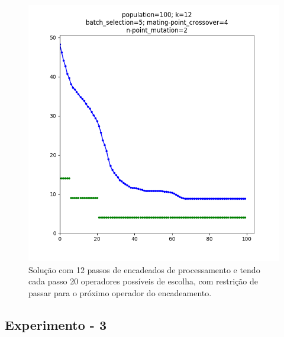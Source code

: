 \documentclass[fleqn,12pt]{SelfArx} %
\begin{document}
\begin{figure}[ht]\centering
\includegraphics[width=\linewidth]{./experiments/media_steps_12_op_20}
\caption{Solução com 12 passos de encadeados de processamento e tendo cada passo
20 operadores possíveis de escolha, com restrição de passar para o próximo
operador do encadeamento.}
\label{fig:media_steps_12_op_20}
\end{figure}

\medskip
\medskip
\medskip
\medskip
\medskip
\medskip
\medskip
\medskip
\medskip
\medskip
\medskip
\medskip
\medskip
\medskip
\medskip
\medskip
\medskip
\medskip
\medskip
\medskip
\medskip
\medskip
\medskip
\medskip

\pagebreak

\subsection{Experimento - 3}
\end{document}
